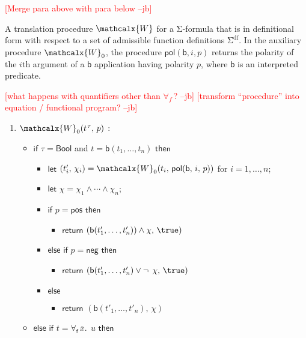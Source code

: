 \documentclass[runningheads,a4paper]{llncs}
\newcommand{\con}[1]{\mathsf{#1}}
\renewcommand\vec[1]{\overline{#1}}
\let\oldSigma=\Sigma
\def\Sigma{\mathrm{\oldSigma}}
\let\oldneg=\neg
\def\neg{\oldneg\:}
\newcommand{\conv}{\mathcalx{W}}
\newcommand{\sfundefs}[1]{#1^\mathrm{df}}
\newcommand{\ptrue}{\con{pos}}
\newcommand{\pfalse}{\con{neg}}
\newcommand{\pol}{\con{pol}}
\newcommand{\Bool}{\con{Bool}}
\newcommand{\boolop}{\con{b}}
\newcommand{\forallf}[1]{\forall_{\!#1\:}}
\newcommand{\rem}[1]{\textcolor{red}{[#1]}}
\newcommand{\jb}[1]{\rem{#1 --jb}}
\newcommand{\vthinspace}{\kern+0.083333em}
\newcommand{\typ}[1]{^{\vthinspace #1}}
\begin{document}
\jb{Merge para above with para below}

A translation procedure $\conv$ for a $\Sigma$-formula that is in definitional
form with respect to a set of admissible function definitions
$\sfundefs{\Sigma}$. In the auxiliary procedure $\conv_0$, the procedure $\pol(
\boolop, i, p )$ returns the polarity of the $i${th} argument of a
$\boolop$ application having polarity $p$, where $\boolop$ is an interpreted
predicate.

\jb{what happens with quantifiers other than $\forallf{f}$?}
\jb{transform ``procedure'' into equation / functional program?}

\begin{enumerate}
\item[\ ] 
$\conv_0( t\typ{\tau},\, p )$ : 
 \begin{itemize}
   \item[] $\mathsf{if}$ $\tau = \Bool$ and $t = \boolop(t_1,\ldots,t_n)$ $\mathsf{then}$
    \begin{itemize}
      \item[] $\mathsf{let}$ $( t'_i,\, \chi_i ) = \conv_0( t_i,\, \pol( \boolop,\, i,\, p ) )$ for $i = 1, \ldots, n$;
      \item[] $\mathsf{let}$ $\chi = \chi_1 \mathrel\wedge \cdots \mathrel\wedge \chi_n$;
      \item[] $\mathsf{if}$ $p = \ptrue$ $\mathsf{then}$
      \begin{itemize}
        \item[] $\mathsf{return}$ $( \boolop(t'_1, \ldots, t'_n) ) \wedge \chi,\, \true )$
      \end{itemize}
      \item[] $\mathsf{else}$ $\mathsf{if}$ $p = \pfalse$ $\mathsf{then}$
      \begin{itemize}
        \item[] $\mathsf{return}$ $( \boolop(t'_1, \ldots, t'_n) \vee \neg \chi,\, \true )$
      \end{itemize}
      \item[] $\mathsf{else}$
      \begin{itemize}
        \item[] $\mathsf{return}$ $( \boolop(t'_1, \ldots, t'_n),\, \chi )$
      \end{itemize}
    \end{itemize}
  \item[] $\mathsf{else}$ $\mathsf{if}$ $t = \forallf{\con{f}} \vec x.\;\, u$ $\mathsf{then}$

\end{itemize}
\end{enumerate}
\end{document}
